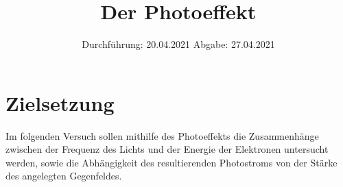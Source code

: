 

\subject{V500}
\title{Der Photoeffekt}
\date{
    Durchführung: 20.04.2021
     \hspace{3em}
    Abgabe: 27.04.2021
}


\maketitle
\thispagestyle{empty}
\tableofcontents
\newpage

\section{Zielsetzung}

    Im folgenden Versuch sollen mithilfe des Photoeffekts die Zusammenhänge zwischen der Frequenz des Lichts und der
    Energie der Elektronen untersucht werden,
    sowie die Abhängigkeit des resultierenden Photostroms von der Stärke des angelegten Gegenfeldes.


\clearpage


\clearpage


\clearpage


\clearpage

\printbibliography


